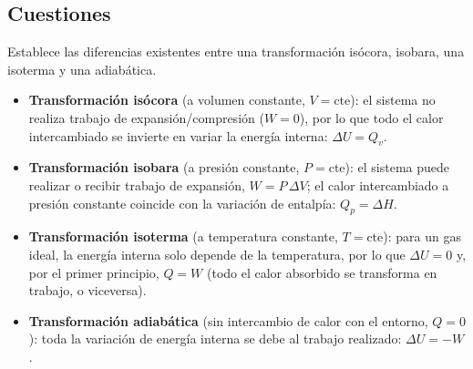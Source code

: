 \subsection{Cuestiones}


\begin{question}
    Establece las diferencias existentes entre una transformación isócora, isobara, una isoterma y una adiabática.


    \begin{solu}


        \begin{itemize}
            \item \textbf{Transformación isócora} (a volumen constante, \(V = \text{cte}\)): el sistema no realiza trabajo de expansión/compresión (\(W=0\)), por lo que todo el calor intercambiado se invierte en variar la energía interna: \(\Delta U = Q_v\).
            \item \textbf{Transformación isobara} (a presión constante, \(P = \text{cte}\)): el sistema puede realizar o recibir trabajo de expansión, \(W = P\,\Delta V\); el calor intercambiado a presión constante coincide con la variación de entalpía: \(Q_p = \Delta H\).
            \item \textbf{Transformación isoterma} (a temperatura constante, \(T = \text{cte}\)): para un gas ideal, la energía interna solo depende de la temperatura, por lo que \(\Delta U = 0\) y, por el primer principio, \(Q = W\) (todo el calor absorbido se transforma en trabajo, o viceversa).
            \item \textbf{Transformación adiabática} (sin intercambio de calor con el entorno, \(Q = 0\)): toda la variación de energía interna se debe al trabajo realizado: \(\Delta U = -W\).
        \end{itemize}
    \end{solu}
\end{question}


